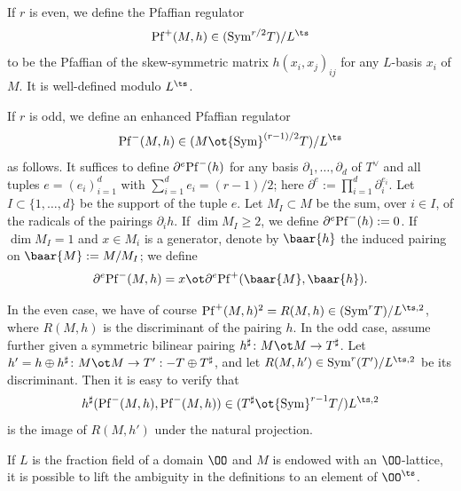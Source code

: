  If $r$ is even, we define the Pfaffian regulator  $${\rm Pf}^{+}(M, h)\in ({\rm Sym}^{r/2}T )/ L^{\ts}$$
 to be the Pfaffian of the skew-symmetric matrix $h(x_{i}, x_{j})_{ij}$ for any $L$-basis $x_{i}$ of $M$. It is well-defined modulo $L^{\ts}$.

 If $r$ is odd, we define an enhanced Pfaffian regulator
  $${\rm Pf}^{-}(M, h)\in (M\ot {\rm Sym}^{(r-1)/2}T )/ L^{\ts}$$
as follows. It suffices to define $\partial^{e}{\rm Pf}^{-}(h) $ for any basis $\partial_{1}, \ldots, \partial_{d}$ of $T^{\vee}$ and all tuples $e=(e_{i})_{i=1}^{d}$ with $\sum_{i=1}^{d}e_{i}= (r-1)/2$; here $\partial^{e}:= \prod_{i=1}^{d} \partial_{i}^{e_{i}} $. Let $I\subset \{1, \ldots, d\}$ be the support of the tuple $e$. Let $M_{I}   \subset M$ be the sum, over $i \in I$,  of the radicals of the pairings $\partial_{i} h$. If $\dim M_{I}\geq 2$, we define $
\partial^{e} {\rm Pf}^{-}(h) :=0$. If $\dim M_{I}=1$ and $x\in M_{i}$ is a generator,  denote by $\baar{h}$ the induced pairing on $\baar{M}:= M/M_{I}$; we define
$$\partial^{e} {\rm Pf}^{-}(M, h)  = x\ot \partial^{e} {\rm Pf}^{+}(\baar{M}, \baar{h}). $$

\begin{rema}
\notready{} In the even case, we have of course ${\rm Pf}^{+}(M, h) ^{2}  = R(M, h)\in ( {\rm Sym}^{r}T )/ L^{\ts,2}$, where $R(M, h)$ is the discriminant of the pairing $h$. In the odd case, assume further given a symmetric bilinear pairing $h^{\sharp}\colon M\ot M\to T^{\sharp}$. Let $h'=h\oplus h^{\sharp}\colon M\ot M\to T':-T\oplus T^{\sharp}$, and let $R(M, h')\in {\rm Sym}^{r}( T')/L^{\ts, 2}$ be its discriminant. Then it is easy to verify that
$$h^{\sharp}( {\rm Pf}^{-}(M, h), {\rm Pf}^{-}(M, h))\in (T^{\sharp}\ot {\rm Sym}^{r-1}T/) L^{\ts, 2}$$
 is the image of $R(M, h')$ under the natural projection.
\end{rema}

\begin{rema}
\notready{} If $L$ is the fraction field of a domain $\OO$ and $M$ is endowed with an $\OO$-lattice, it is possible to lift the ambiguity in the definitions to an element of $\OO^{\ts}$.
\end{rema}












